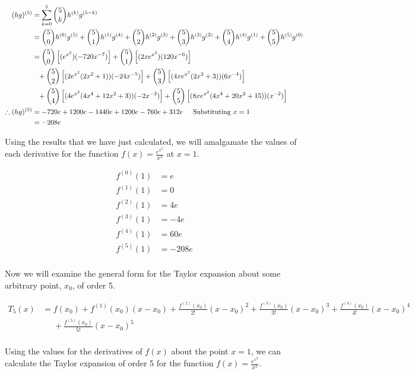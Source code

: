 \documentclass[a4paper]{article}
\begin{document}
\begin{enumerate}[label=\textbf{\arabic*.}]
\begin{enumerate}
		\begin{align*}
		(hg)^{(5)} & = \sum_{k = 0}^{5}
		\binom{5}{k} h^{(k)}g^{(5-k)}\\
		& = \binom{5}{0}h^{(0)}g^{(5)} + \binom{5}{1}h^{(1)}g^{(4)} + \binom{5}{2}h^{(2)}g^{(3)} + \binom{5}{3}h^{(3)}g^{(2)} + \binom{5}{4}h^{(4)}g^{(1)} + \binom{5}{5}h^{(5)}g^{(0)}\\
		& = \binom{5}{0}\left[(e^{x^2})(-720x^{-7})\right] + \binom{5}{1}\left[(2xe^{x^2})(120x^{-6})\right] \\
		& \phantom{{=}} + \binom{5}{2}\left[(2e^{x^2}(2x^2+1))(-24x^{-5})\right] + \binom{5}{3}\left[(4xe^{x^2}(2x^2+3))(6x^{-4})\right]\\ 
		& \phantom{{=}} + \binom{5}{4}\left[(4e^{x^2}(4x^4+12x^2+3))(-2x^{-3})\right] + \binom{5}{5}\left[(8xe^{x^2}(4x^4+20x^2+15))(x^{-2})\right]\\
		\therefore (hg)^{(5)} & = -720e + 1200e -1440e + 1200e -760e + 312e \hspace{5mm} \text{Substituting } x = 1\\
		& = -208e\\
		\end{align*}

		Using the results that we have just calculated, we will amalgamate the values of each derivative for the function $\displaystyle{f(x) = \frac{e^{x^2}}{x^2}}$ at $x=1$.

		\begin{align*}
		f^{(0)}(1) & = e\\
		f^{(1)}(1) & = 0\\
		f^{(2)}(1) & = 4e\\
		f^{(3)}(1) & = -4e\\
		f^{(4)}(1) & = 60e\\
		f^{(5)}(1) & = -208e\\
		\end{align*}

		Now we will examine the general form for the Taylor expansion about some arbitrary point, $x_0$, of order 5. 

		\begin{align*}
		T_5(x) & = f(x_0) + f^{(1)}(x_0)(x-x_0) + \frac{f^{(2)}(x_0)}{2!}(x-x_0)^2 + \frac{f^{(3)}(x_0)}{3!}(x-x_0)^3 + \frac{f^{(4)}(x_0)}{4!}(x-x_0)^4\\ 
		& \phantom{{=}} + \frac{f^{(5)}(x_0)}{5!}(x-x_0)^5\\
		\end{align*}

		Using the values for the derivatives of $f(x)$ about the point $x=1$, we can calculate the Taylor expansion of order 5 for the function $\displaystyle{f(x) = \frac{e^{x^2}}{x^2}}$.


\end{enumerate}
\end{enumerate}
\end{document}
